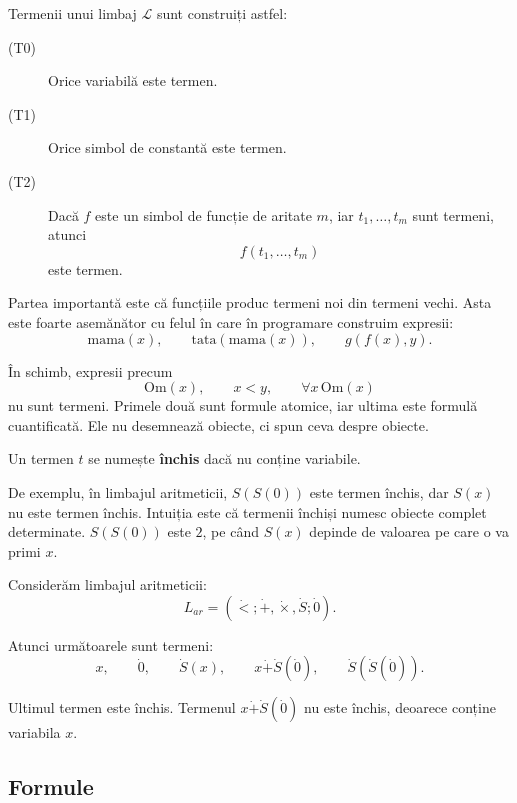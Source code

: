 \begin{definition}
	Termenii unui limbaj \( \mathcal{L} \) sunt construiți astfel:

	\begin{description}
		\item[(T0)] Orice variabilă este termen.
		\item[(T1)] Orice simbol de constantă este termen.
		\item[(T2)] Dacă \(f\) este un simbol de funcție de aritate \(m\), iar \(t_1, \dots, t_m\) sunt termeni, atunci
		      \[
			      f(t_1, \dots, t_m)
		      \]
		      este termen.
	\end{description}
\end{definition}

Partea importantă este că funcțiile produc termeni noi din termeni vechi. Asta este foarte asemănător cu felul în care în programare construim expresii:
\[
	\mathrm{mama}(x), \qquad \mathrm{tata}(\mathrm{mama}(x)), \qquad g(f(x), y).
\]

În schimb, expresii precum
\[
	\mathrm{Om}(x), \qquad x < y, \qquad \forall x \, \mathrm{Om}(x)
\]
nu sunt termeni. Primele două sunt formule atomice, iar ultima este formulă cuantificată. Ele nu desemnează obiecte, ci spun ceva despre obiecte.

\begin{definition}
	Un termen \(t\) se numește \textbf{închis} dacă nu conține variabile.
\end{definition}

De exemplu, în limbajul aritmeticii, \(S(S(0))\) este termen închis, dar \(S(x)\) nu este termen închis. Intuiția este că termenii închiși numesc obiecte complet determinate.
\(S(S(0))\) este \(2\), pe când \(S(x)\) depinde de valoarea pe care o va primi \(x\).

\begin{eg}
	Considerăm limbajul aritmeticii:
	\[
		L_{ar} = (\dot{<}; \dot{+}, \dot{\times}, \dot{S}; \dot{0}).
	\]

	Atunci următoarele sunt termeni:
	\[
		x, \qquad \dot{0}, \qquad \dot{S}(x), \qquad x \dot{+} \dot{S}(\dot{0}), \qquad \dot{S}(\dot{S}(\dot{0})).
	\]

	Ultimul termen este închis. Termenul \(x \dot{+} \dot{S}(\dot{0})\) nu este închis, deoarece conține variabila \(x\).
\end{eg}

\subsection{Formule}

